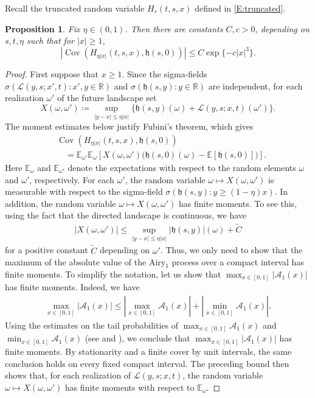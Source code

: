 \documentclass[12pt, reqno]{amsart}
\numberwithin{equation}{section}
\newtheorem{proposition}[theorem]{Proposition}
\theoremstyle{definition}
\newcommand{\R}{\mathbb{R}}
\newcommand{\E}{\mathbb{E}}
\newcommand{\h}{\mathfrak{h}}
\newcommand{\Cov}{\operatorname{Cov}}
\newcommand{\Lcal}{\mathcal{L}}
\begin{document}
Recall the truncated random variable $H_r(t,s,x)$ defined in
\eqref{E:truncated}.


\begin{proposition}\label{P:mixing-window}
  Fix $\eta\in(0,1)$. Then there are constants $C,c>0$, depending on $s,t,\eta$
  such that for $|x|\ge1$,
  \begin{equation}
    |\Cov(H_{\eta|x|}(t,s, x),\h(s,0))|
    \le C\exp\{-c |x|^3\}.
    \label{E:mixing-window-bound}
  \end{equation}
\end{proposition}

\begin{proof} 
  First suppose that $x\geq1$. Since the sigma-fields
  $\sigma(\Lcal(y,s;x',t):x',y\in\R)$ and $\sigma(\h(s,y):y\in\R)$ are
  independent, for each realization $\omega'$ of the future landscape set
  \[
    X(\omega,\omega')
    \coloneqq\sup_{|y-x|\leq\eta|x|}
      \{\h(s,y)(\omega)+\Lcal(y,s;x,t)(\omega')\}.
  \]
  The moment estimates below justify Fubini's theorem, which gives
  \begin{align*}
    &\Cov(H_{\eta|x|}(t,s,x),\h(s,0))\\
    &\quad=\E_{\omega'}\E_{\omega}\!\left[
      X(\omega,\omega')
      \bigl(\h(s,0)(\omega)-\E[\h(s,0)]\bigr)\right].
  \end{align*}
  Here $\E_\omega$ and $\E_{\omega'}$ denote the expectations with respect to
  the random elements $\omega$ and $\omega'$, respectively. For each $\omega'$,
  the random variable $\omega\mapsto X(\omega,\omega')$ is measurable with
  respect to the sigma-field $\sigma(\h(s,y): y\geq
  (1-\eta)x)$.  In addition, the random variable $\omega\mapsto X(\omega,
  \omega')$ has finite moments.  To see this, using the fact that the directed
  landscape is continuous, we have 
  \begin{align*}
  |X(\omega, \omega')| \leq \sup_{|y-x|\leq \eta|x|} |\h(s,y)|(\omega) + \tilde{C} 
  \end{align*}
  for a positive constant $\tilde{C}$ depending on $\omega'$. Thus, we only need
  to show that the maximum of the absolute value of the Airy$_1$ process over a
  compact interval has finite moments. To simplify the notation, let us show
  that $\max_{x\in[0, 1]}|\mathcal{A}_1(x)|$ has finite moments.  Indeed, we
  have
  \begin{align*}
  \max_{x\in[0, 1]}|\mathcal{A}_1(x)| \leq \left|\max_{x\in[0, 1]}\mathcal{A}_1(x)\right|+ \left|\min_{x\in[0, 1]}\mathcal{A}_1(x)\right|.
  \end{align*}
  Using the estimates on the tail probabilities of $\max_{x\in[0,
  1]}\mathcal{A}_1(x)$ and $\min_{x\in[0, 1]}\mathcal{A}_1(x)$ (see
  \cite[Proposition 6.1]{pu:23:ergodicity} and \cite[Lemma
  3.1]{bhattacharjee.pu:25:macroscopic}), we conclude that $\max_{x\in[0,
  1]}|\mathcal{A}_1(x)|$ has finite moments. By stationarity and a finite cover
  by unit intervals, the same conclusion holds on every fixed compact interval.
  The preceding bound then shows that, for each realization of
  $\Lcal(y,s;x,t)$, the random variable $\omega\mapsto X(\omega,\omega')$ has
  finite moments with respect to $\E_\omega$.
           

\end{proof}
\end{document}
